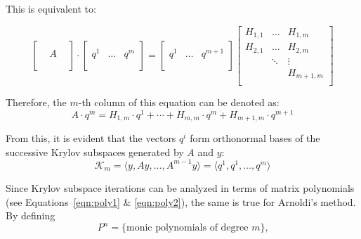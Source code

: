 \noindent This is equivalent to:

\begin{equation}
  \left[
    \begin{array}{ccc}
      &  & \\
      & A & \\
      &  & \\
    \end{array}
  \right] \cdot
  \left[
    \begin{array}{c|c|c}
      & & \\
      q^1 &\dots & q^m \\
      & & \\
    \end{array}
  \right] = 
  \left[
    \begin{array}{c|c|c}
      & & \\
      q^1 &\dots & q^{m+1} \\
      & & \\
    \end{array}
  \right]
  \left[
    \begin{array}{ccc}
      H_{1,1} & \dots & H_{1,m} \\
      H_{2,1} & \dots &  H_{2,m}\\
      & \ddots & \vdots \\
      & & H_{m+1, m}  \\
    \end{array}
  \right] 
\end{equation}

\noindent Therefore, the $m$-th column of this equation can be denoted as:
\begin{equation}
    A \cdot q^m = H_{1,m}\cdot q^1+ \cdots + H_{m,m}\cdot q^m + H_{m+1,m}\cdot q^{m+1}
\end{equation}

\noindent From this, it is evident that the vectors $q^i$ form orthonormal bases of the successive Krylov subspaces generated by $A$ and $y$:
\begin{equation}
    \mathcal{K}_m=\langle y, Ay, \dots , A^{m-1}y\rangle = \langle q^1,q^1, \dots , q^{m}\rangle
\end{equation}

\noindent Since Krylov subspace iterations can be analyzed in terms of matrix polynomials (see Equations~\hyperref[eqn:poly1]{\ref{eqn:poly1}} \& \hyperref[eqn:poly2]{\ref{eqn:poly2}}), the same is true for Arnoldi's method. By defining 
\begin{equation}
    P^n = \{\text{monic polynomials of degree }m\}\text{,}
\end{equation}

